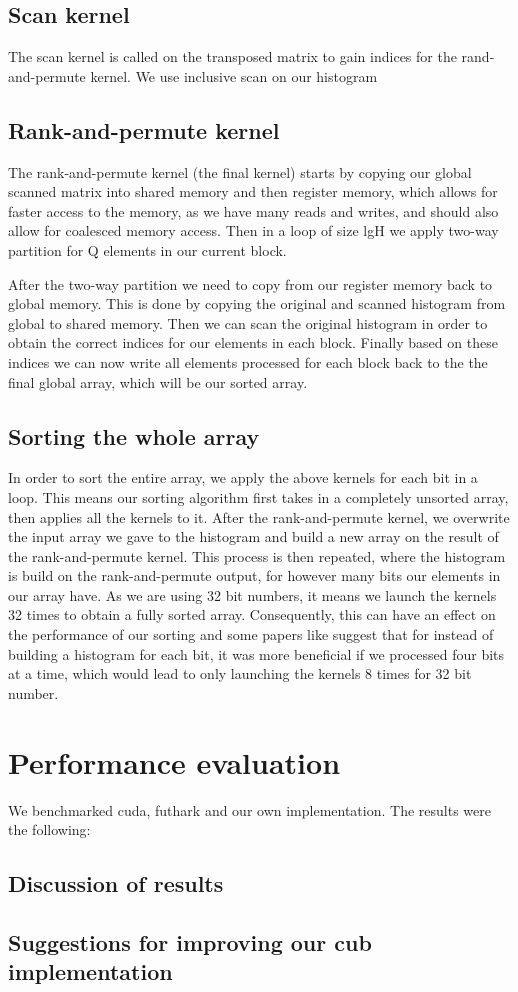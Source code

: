 \documentclass{article}
\begin{document}
\subsection{Scan kernel}
The scan kernel is called on the transposed matrix to gain indices for the rand-and-permute kernel. We use inclusive scan on our histogram


\subsection{Rank-and-permute kernel}
The rank-and-permute kernel (the final kernel) starts by copying our global scanned matrix into shared memory and then register memory, which allows for faster access to the memory, as we have many reads and writes, and should also allow for coalesced memory access. Then in a loop of size lgH we apply two-way partition for Q elements in our current block.


After the two-way partition we need to copy from our register memory back to global memory. This is done by copying the original and scanned histogram from global to shared memory. Then we can scan the original histogram in order to obtain the correct indices for our elements in each block. Finally based on these indices we can now write all elements processed for each block back to the the final global array, which will be our sorted array.

\subsection{Sorting the whole array}
In order to sort the entire array, we apply the above kernels for each bit in a loop. This means our sorting algorithm first takes in a completely unsorted array, then applies all the kernels to it. After the rank-and-permute kernel, we overwrite the input array we gave to the histogram and build a new array on the result of the rank-and-permute kernel. This process is then repeated, where the histogram is build on the rank-and-permute output, for however many bits our elements in our array have. As we are using 32 bit numbers, it means we launch the kernels 32 times to obtain a fully sorted array. Consequently, this can have an effect on the performance of our sorting and some papers like \cite{p} suggest that for instead of building a histogram for each bit, it was more beneficial if we processed four bits at a time, which would lead to only launching the kernels 8 times for 32 bit number. 

\section{Performance evaluation}
We benchmarked cuda, futhark and our own implementation. The results were the following:

\subsection{Discussion of results}

\subsection{Suggestions for improving our cub implementation}



\end{document}
